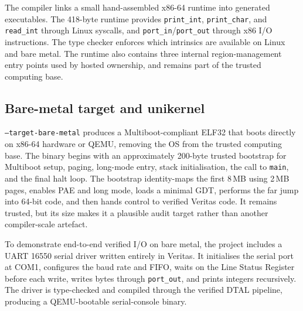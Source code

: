 The compiler links a small hand-assembled x86-64 runtime into generated executables. The 418-byte runtime provides \texttt{print\_int}, \texttt{print\_char}, and \texttt{read\_int} through Linux syscalls, and \texttt{port\_in}/\texttt{port\_out} through x86 I/O instructions. The type checker enforces which intrinsics are available on Linux and bare metal. The runtime also contains three internal region-management entry points used by hosted ownership, and remains part of the trusted computing base.

\subsection{Bare-metal target and unikernel}\label{sec:unikernel}

\texttt{--target-bare-metal} produces a Multiboot-compliant ELF32 that boots directly on x86-64 hardware or QEMU, removing the OS from the trusted computing base. The binary begins with an approximately 200-byte trusted bootstrap for Multiboot setup, paging, long-mode entry, stack initialisation, the call to \texttt{main}, and the final halt loop. The bootstrap identity-maps the first 8\,MB using 2\,MB pages, enables PAE and long mode, loads a minimal GDT, performs the far jump into 64-bit code, and then hands control to verified Veritas code. It remains trusted, but its size makes it a plausible audit target rather than another compiler-scale artefact.

To demonstrate end-to-end verified I/O on bare metal, the project includes a UART 16550 serial driver written entirely in Veritas. It initialises the serial port at COM1, configures the baud rate and FIFO, waits on the Line Status Register before each write, writes bytes through \texttt{port\_out}, and prints integers recursively. The driver is type-checked and compiled through the verified DTAL pipeline, producing a QEMU-bootable serial-console binary.

